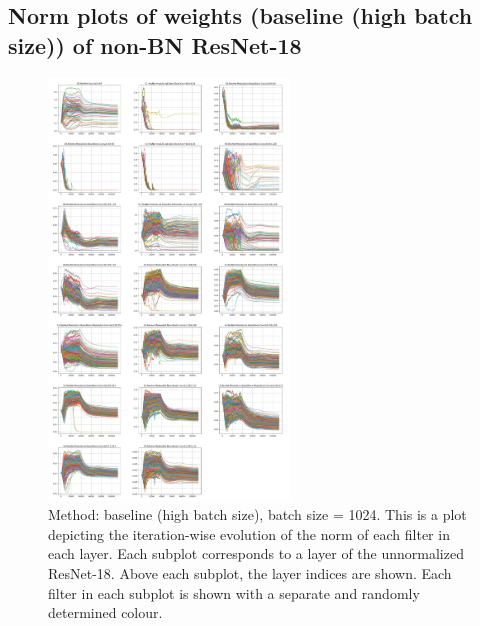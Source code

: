 \documentclass[runningheads]{llncs}
\begin{document}
\subsection{Norm plots of weights (baseline (high batch size)) of non-BN ResNet-18}
\label{sec:plots2}
\begin{figure}[ht] \centering
\includegraphics[width=0.57\textwidth]{baseline_high_bs-w_norm} \caption{ Method:
baseline (high batch size), batch size = 1024. This is a plot depicting the
iteration-wise evolution of the norm of each filter in each layer. Each subplot
corresponds to a layer of the unnormalized ResNet-18. Above each subplot, the layer
indices are shown. Each filter in each subplot is shown with a separate and randomly
determined colour. } \end{figure}

\clearpage
\end{document}
